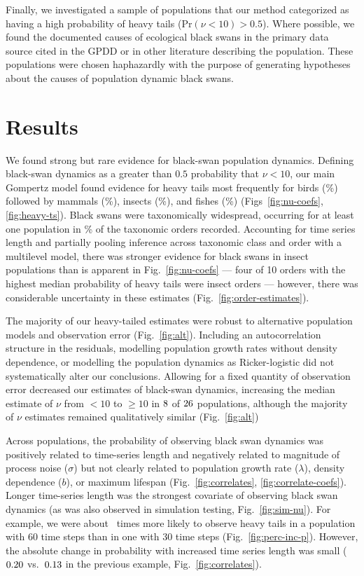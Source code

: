 Finally, we investigated a sample of populations that our method categorized as
having a high probability of heavy tails (Pr$(\nu < 10) > 0.5$). Where
possible, we found the documented causes of ecological black swans in the
primary data source cited in the GPDD or in other literature describing the
population. These populations were chosen haphazardly with the purpose of
generating hypotheses about the causes of population dynamic black swans.

\section{Results}

We found strong but rare evidence for black-swan population dynamics. Defining
black-swan dynamics as a greater than $0.5$ probability that $\nu < 10$, our
main Gompertz model found evidence for heavy tails most frequently for birds
(\birdPH\%) followed by mammals (\mammalsPH\%), insects (\insectsPH\%), and
fishes (\fishPH\%) (Figs~\ref{fig:nu-coefs}, \ref{fig:heavy-ts}). Black swans
were taxonomically widespread, occurring for at least one population in
\POrdersHeavy\% of the taxonomic orders recorded. Accounting for time series
length and partially pooling inference across taxonomic class and order with
a multilevel model, there was stronger evidence for black swans in insect
populations than is apparent in Fig.~\ref{fig:nu-coefs} --- four of 10 orders
with the highest median probability of heavy tails were insect orders ---
however, there was considerable uncertainty in these estimates
(Fig.~\ref{fig:order-estimates}).

The majority of our heavy-tailed estimates were robust to alternative
population models and observation error (Fig.~\ref{fig:alt}). Including an
autocorrelation structure in the residuals, modelling population growth rates
without density dependence, or modelling the population dynamics as
Ricker-logistic did not systematically alter our conclusions. Allowing for
a fixed quantity of observation error decreased our estimates of black-swan
dynamics, increasing the median estimate of $\nu$ from $<10$ to $\ge 10$ in
$8$ of $26$ populations, although the majority of
$\nu$ estimates remained qualitatively similar (Fig.~\ref{fig:alt})

Across populations, the probability of observing black swan dynamics was
positively related to time-series length and negatively related to magnitude of
process noise ($\sigma$) but not clearly related to population growth rate
($\lambda$), density dependence ($b$), or maximum lifespan
(Fig.~\ref{fig:correlates}, \ref{fig:correlate-coefs}). Longer time-series
length was the strongest covariate of observing black swan dynamics (as was
also observed in simulation testing, Fig.~\ref{fig:sim-nu}). For example,
we were about \pIncHeavyNThirtyNSixty~times more likely to observe heavy tails
in a population with 60 time steps than in one with 30 time steps
(Fig.~\ref{fig:perc-inc-p}). However, the absolute change in probability with
increased time series length was small ($0.20$ vs.\
$0.13$ in the previous example, Fig.~\ref{fig:correlates}).

